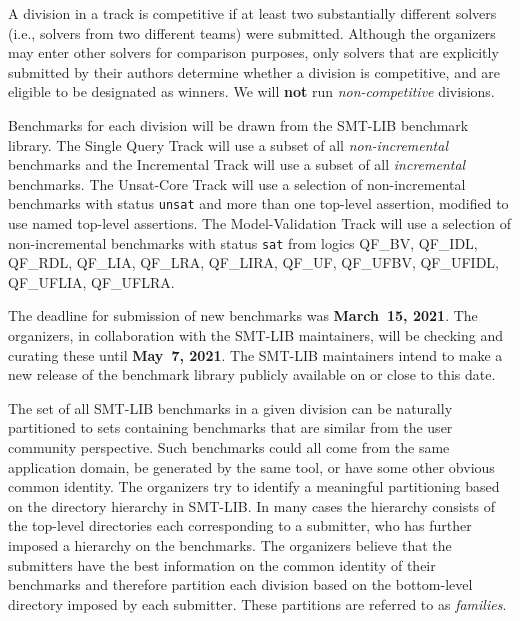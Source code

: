 \documentclass[12pt]{article}
\newcommand{\maintrack}{Single Query Track\xspace}
\newcommand{\inctrack}{Incremental Track\xspace}
\newcommand{\ucoretrack}{Unsat-Core Track\xspace}
\newcommand{\mvaltrack}{Model-Validation Track\xspace}
\newcommand{\challtrack}{Industry-Challenge Track\xspace}
\begin{document}
A division in a track is competitive if at least two substantially
different solvers (i.e., solvers from two different teams) were
submitted.  Although the organizers may enter other solvers for
comparison purposes, only solvers that are explicitly submitted by
their authors determine whether a division is competitive, and are
eligible to be designated as winners.
We will \textbf{not} run \emph{non-competitive} divisions.

Benchmarks for each division will be drawn from the SMT-LIB benchmark library.
The \maintrack will use a subset of all \emph{non-incremental} benchmarks and
the \inctrack will use a subset of all \emph{incremental} benchmarks.
%
%
The \ucoretrack will use a selection of non-incremental benchmarks with status
\texttt{unsat} and more than one top-level assertion, modified to use named
top-level assertions.  The \mvaltrack will use a selection of non-incremental
benchmarks with status \texttt{sat} from logics QF\_BV, QF\_IDL, QF\_RDL,
QF\_LIA, QF\_LRA, QF\_LIRA, QF\_UF, QF\_UFBV, QF\_UFIDL, QF\_UFLIA, QF\_UFLRA.

The deadline for submission of new benchmarks was {\bf March~15, 2021}.
The organizers, in collaboration with the SMT-LIB maintainers, will be
checking and curating these until {\bf May~7, 2021}.  The SMT-LIB
maintainers intend to make a new release of the benchmark library
publicly available on or close to this date.

The set of all SMT-LIB benchmarks in a given division can be naturally
partitioned to sets containing benchmarks that are similar from the user
community perspective.  Such benchmarks could all come from the same
application domain, be generated by the same tool, or have some other
obvious common identity.
%
The organizers try to identify a meaningful partitioning based on the
directory hierarchy in SMT-LIB.  In many cases the hierarchy consists of
the top-level directories each corresponding to a submitter, who has
further imposed a hierarchy on the benchmarks.
%
The organizers believe that the submitters have the best information on
the common identity of their benchmarks and therefore partition each
division based on the bottom-level directory imposed by each submitter.
These partitions are referred to as \emph{families}.
\end{document}
